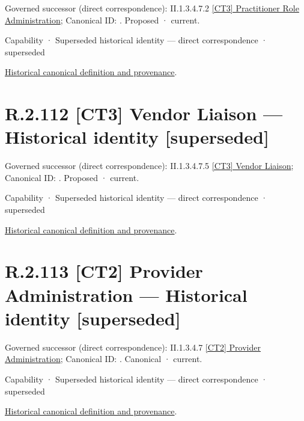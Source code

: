 {\small Governed successor (direct correspondence): II.1.3.4.7.2 \hyperref[element:6651471e67ae46fb8d1c1241c8590be9]{[CT3] Practitioner Role Administration}; Canonical ID: \texttt{}. Proposed · current.}\par
\label{element:6b777f1201db474eb22dd89f2b1f68c6}
{\small Capability · Superseded historical identity — direct correspondence · superseded}\par
\href{../../../../../../../continuum/strategy/capability/6b777f1201db474eb22dd89f2b1f68c6.md}{Historical canonical definition and provenance}.\par
\section*{R.2.112 [CT3] Vendor Liaison — Historical identity [superseded]}
\label{navigation:R.2.112}

{\small Governed successor (direct correspondence): II.1.3.4.7.5 \hyperref[element:66358bd6698e4050b12342522fbbb923]{[CT3] Vendor Liaison}; Canonical ID: \texttt{}. Proposed · current.}\par
\label{element:29076cbb9fc5442fb25faf43947574f7}
{\small Capability · Superseded historical identity — direct correspondence · superseded}\par
\href{../../../../../../../continuum/strategy/capability/29076cbb9fc5442fb25faf43947574f7.md}{Historical canonical definition and provenance}.\par
\section*{R.2.113 [CT2] Provider Administration — Historical identity [superseded]}
\label{navigation:R.2.113}

{\small Governed successor (direct correspondence): II.1.3.4.7 \hyperref[element:d6312f85968a4209bafff5ed009297a6]{[CT2] Provider Administration}; Canonical ID: \texttt{}. Canonical · current.}\par
\label{element:a352fd50419d451887c85fcb98566cd5}
{\small Capability · Superseded historical identity — direct correspondence · superseded}\par
\href{../../../../../../../continuum/strategy/capability/a352fd50419d451887c85fcb98566cd5.md}{Historical canonical definition and provenance}.\par
